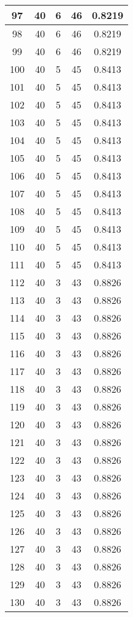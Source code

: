 \documentclass[letterpaper, 12pt]{article}
\begin{document}
\begin{longtable}{|c|c|c|c|c|}
\hline
97 & 40 & 6 & 46 & 0.8219 \\
\hline
98 & 40 & 6 & 46 & 0.8219 \\
\hline
99 & 40 & 6 & 46 & 0.8219 \\
\hline
100 & 40 & 5 & 45 & 0.8413 \\
\hline
101 & 40 & 5 & 45 & 0.8413 \\
\hline
102 & 40 & 5 & 45 & 0.8413 \\
\hline
103 & 40 & 5 & 45 & 0.8413 \\
\hline
104 & 40 & 5 & 45 & 0.8413 \\
\hline
105 & 40 & 5 & 45 & 0.8413 \\
\hline
106 & 40 & 5 & 45 & 0.8413 \\
\hline
107 & 40 & 5 & 45 & 0.8413 \\
\hline
108 & 40 & 5 & 45 & 0.8413 \\
\hline
109 & 40 & 5 & 45 & 0.8413 \\
\hline
110 & 40 & 5 & 45 & 0.8413 \\
\hline
111 & 40 & 5 & 45 & 0.8413 \\
\hline
112 & 40 & 3 & 43 & 0.8826 \\
\hline
113 & 40 & 3 & 43 & 0.8826 \\
\hline
114 & 40 & 3 & 43 & 0.8826 \\
\hline
115 & 40 & 3 & 43 & 0.8826 \\
\hline
116 & 40 & 3 & 43 & 0.8826 \\
\hline
117 & 40 & 3 & 43 & 0.8826 \\
\hline
118 & 40 & 3 & 43 & 0.8826 \\
\hline
119 & 40 & 3 & 43 & 0.8826 \\
\hline
120 & 40 & 3 & 43 & 0.8826 \\
\hline
121 & 40 & 3 & 43 & 0.8826 \\
\hline
122 & 40 & 3 & 43 & 0.8826 \\
\hline
123 & 40 & 3 & 43 & 0.8826 \\
\hline
124 & 40 & 3 & 43 & 0.8826 \\
\hline
125 & 40 & 3 & 43 & 0.8826 \\
\hline
126 & 40 & 3 & 43 & 0.8826 \\
\hline
127 & 40 & 3 & 43 & 0.8826 \\
\hline
128 & 40 & 3 & 43 & 0.8826 \\
\hline
129 & 40 & 3 & 43 & 0.8826 \\
\hline
130 & 40 & 3 & 43 & 0.8826 \\

\end{longtable}
\end{document}
